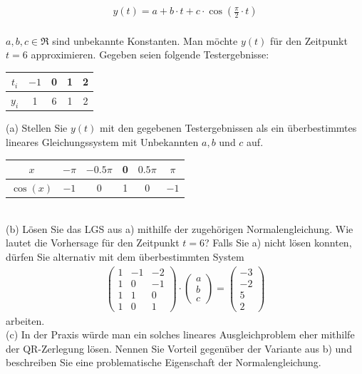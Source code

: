 \documentclass{scrartcl}
\begin{document}
	\begin{align*}
		y(t) = a + b \cdot t + c \cdot \cos\left( \frac{\pi}{2} \cdot t \right)
	\end{align*}
	\\
	$a,b,c \in \Re$ sind unbekannte Konstanten. Man möchte $y(t)$ für den Zeitpunkt $t = 6$ approximieren.
	\n 
	Gegeben seien folgende Testergebnisse:
	\begin{tabular}{c|cccc}
		$t_i$ & $-1$ & 0 & 1 & 2 \\ \midrule
		$y_i$ & 1 & 6 & 1 & 2
	\end{tabular}
	\n
	(a)
	Stellen Sie $y(t)$ mit den gegebenen Testergebnissen als ein überbestimmtes lineares Gleichungssystem mit Unbekannten $a, b$ und $c$ auf.
	\n 
	\begin{tabular}{c|ccccc}
		$x$ & $-\pi$ & $-0.5\pi$ & 0 & $0.5\pi$ & $\pi$ \\ \midrule
		$\cos(x)$ & $-1$ & 0 & 1 & 0 & $-1$
	\end{tabular}
	\lbreak \lbreak \lbreak \lbreak
	\\
	(b)
	Lösen Sie das LGS aus a) mithilfe der zugehörigen Normalengleichung. Wie lautet die Vorhersage für den Zeitpunkt $t=6$?
	\n 
	Falls Sie a) nicht lösen konnten, dürfen Sie alternativ mit dem  überbestimmten System
	\begin{align*}
		\begin{pmatrix}
			1 & -1 & -2 \\
			1 & 0 & -1 \\
			1 & 1 & 0 \\
			1 & 0 & 1
		\end{pmatrix} \cdot 
		\begin{pmatrix}
			a \\ b \\ c
		\end{pmatrix} =
		\begin{pmatrix}
			-3 \\ -2 \\ 5 \\ 2
		\end{pmatrix}
	\end{align*}
	arbeiten.
	\lbreak \lbreak \lbreak \lbreak
	\\
	(c)
	In der Praxis würde man ein solches lineares Ausgleichproblem eher mithilfe der QR-Zerlegung lösen. Nennen Sie  Vorteil gegenüber der Variante aus b) und beschreiben Sie  eine problematische Eigenschaft der Normalengleichung.
\end{document}
